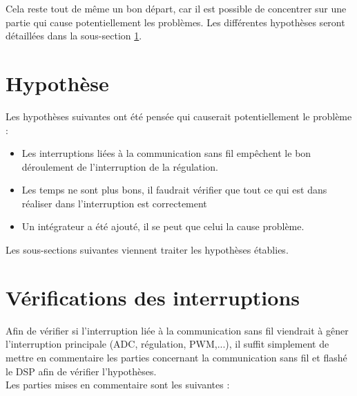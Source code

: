 Cela reste tout de même un bon départ, car il est possible de concentrer sur une partie qui cause potentiellement les problèmes. Les différentes hypothèses seront détaillées dans la sous-section \ref{sec:Hypothese}.

\section{Hypothèse}
\label{sec:Hypothese}

Les hypothèses suivantes ont été pensée qui causerait potentiellement le problème :

\begin{itemize}
    \item Les interruptions liées à la communication sans fil empêchent le bon déroulement de l'interruption de la régulation.
    \item Les temps ne sont plus bons, il faudrait vérifier que tout ce qui est dans réaliser dans l'interruption est correctement
    \item Un intégrateur a été ajouté, il se peut que celui la cause problème.
\end{itemize}

Les sous-sections suivantes viennent traiter les hypothèses établies.

\section{Vérifications des interruptions}

Afin de vérifier si l'interruption liée à la communication sans fil viendrait à gêner l'interruption principale (ADC, régulation, PWM,...), il suffit simplement de mettre en commentaire les parties concernant la communication sans fil et flashé le DSP afin de vérifier l'hypothèses.\\

Les parties mises en commentaire sont les suivantes :


